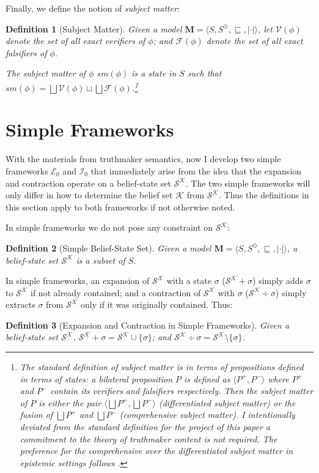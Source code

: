 \documentclass[12pt]{article}
\newtheorem{definition}{Definition}[section]
\newcommand{\K}{\mathcal{K}}
\newcommand{\SK}{\mathcal{S}^\mathcal{K}}
\begin{document}
Finally, we define the notion of \textit{subject matter}: 
\begin{definition}[Subject Matter] 
    Given a model $\bm{M} = \langle S, S^\Diamond, \sqsubseteq, | \cdot  | \rangle$, let $\mathcal{V}(\phi)$ denote the set of all exact verifiers of $\phi$; and $\mathcal{F}(\phi)$ denote the set of all exact falsifiers of $\phi$. \par
    The subject matter of $\phi$ $sm(\phi)$ is a state in $S$ such that $sm(\phi) = \bigsqcup \mathcal{V}(\phi) \sqcup \bigsqcup \mathcal{F}(\phi)$.\footnote{
        The standard definition of subject matter is in terms of \textit{propositions} defined in terms of states: a \textit{bilateral proposition} $P$ is defined as $\langle P^+, P^- \rangle$ where $P^+$ and $P^-$ contain its verifiers and falsifiers respectively. Then the subject matter of $P$ is either the pair $\langle \bigsqcup P^+, \bigsqcup P^- \rangle$ (\textit{differentiated subject matter}) or the fusion of $\bigsqcup P^+$ and $\bigsqcup P^-$ (\textit{comprehensive subject matter}). I intentionally deviated from the standard definition for the project of this paper a commitment to the theory of truthmaker content is not required. The preference for the comprehensive over the differentiated subject matter in epistemic settings follows .
    }
\end{definition}


\section{Simple Frameworks}
With the materials from truthmaker semantics, now I develop two simple frameworks $\mathcal{E}_0$ and $\mathcal{I}_0$ that immediately arise from the idea that the expansion and contraction operate on a belief-state set $\SK$. The two simple frameworks will only differ in how to determine the belief set $\K$ from $\SK$. Thus the definitions in this section apply to both frameworks if not otherwise noted. 
\par
In simple frameworks we do not pose any constraint on $\SK$:
\par
\begin{definition}[Simple Belief-State Set]
    Given a model $\bm{M} = \langle S, S^\Diamond, \sqsubseteq, | \cdot  | \rangle$, a belief-state set $\SK$ is a subset of $S$. \par
\end{definition}
\par
In simple frameworks, an expansion of $\SK$ with a state $\sigma$ ($\SK + \sigma$) simply adds $\sigma$ to $\SK$ if not already contained; and a contraction of $\SK$ with $\sigma$ ($\SK \div \sigma$) simply extracts $\sigma$ from $\SK$ only if it was originally contained. Thus:
\begin{definition}[Expansion and Contraction in Simple Frameworks]
    Given a belief-state set $\SK$, $\SK + \sigma = \SK \cup \{\sigma\}$; and $\SK \div \sigma = \SK \setminus \{\sigma \}$.
\end{definition}
\end{document}
